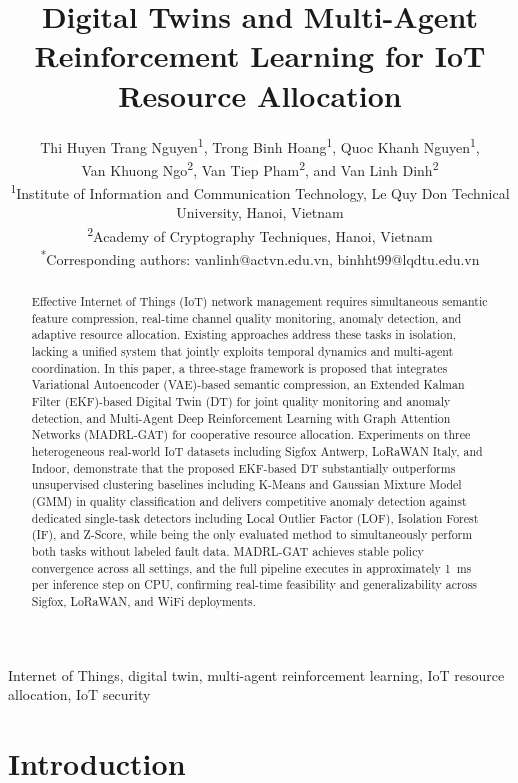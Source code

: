 \documentclass[conference]{IEEEtran}
\title{Digital Twins and Multi-Agent Reinforcement Learning for IoT Resource Allocation}
\author{
Thi Huyen Trang Nguyen\textsuperscript{1}, 
Trong Binh Hoang\textsuperscript{1}, 
Quoc Khanh Nguyen\textsuperscript{1},\\ 
Van Khuong Ngo\textsuperscript{2}, 
Van Tiep Pham\textsuperscript{2}, and 
Van Linh Dinh\textsuperscript{2} \\[1em]

\normalsize
\textsuperscript{1}Institute of Information and Communication Technology, Le Quy Don Technical University, Hanoi, Vietnam\\
\textsuperscript{2}Academy of Cryptography Techniques, Hanoi, Vietnam\\[0.5em]

\textsuperscript{*}Corresponding authors: vanlinh@actvn.edu.vn, binhht99@lqdtu.edu.vn}
\begin{document}
\maketitle
\begin{abstract}
Effective Internet of Things (IoT) network management requires simultaneous semantic feature
compression, real-time channel quality monitoring, anomaly detection, and
adaptive resource allocation. Existing approaches address these tasks in
isolation, lacking a unified system that jointly exploits temporal dynamics
and multi-agent coordination. In this paper, a three-stage framework is proposed that integrates
Variational Autoencoder (VAE)-based semantic compression, an Extended Kalman Filter (EKF)-based Digital Twin (DT) for joint
quality monitoring and anomaly detection, and Multi-Agent Deep Reinforcement Learning with Graph Attention
Networks (MADRL-GAT) for cooperative resource allocation.
Experiments on three heterogeneous real-world IoT datasets
including Sigfox Antwerp, LoRaWAN Italy, and Indoor, demonstrate that the proposed
EKF-based DT substantially outperforms unsupervised clustering baselines
including K-Means and Gaussian Mixture Model (GMM) in quality classification and delivers competitive anomaly detection
against dedicated single-task detectors including Local Outlier Factor (LOF), Isolation Forest (IF), and Z-Score, while being the only evaluated method to simultaneously perform both tasks without labeled fault data. MADRL-GAT achieves stable policy convergence across all settings, and the full pipeline executes in approximately 1~ms per inference step on CPU, confirming real-time feasibility and generalizability across Sigfox, LoRaWAN, and WiFi deployments.
\end{abstract}

\begin{IEEEkeywords}
Internet of Things, digital twin, multi-agent reinforcement learning, IoT resource allocation, IoT security
\end{IEEEkeywords}

\section{Introduction}
\label{sec:intro}
\end{document}
